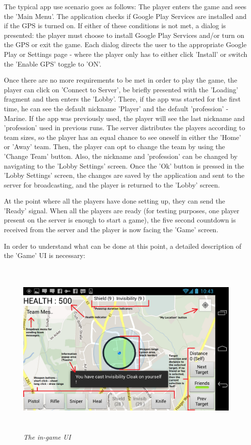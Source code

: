 The typical app use scenario goes as follows: The player enters the game and
sees the 'Main Menu'. The application checks if Google Play Services are
installed and if the GPS is turned on. If either of these conditions is not met,
a dialog is presented: the player must choose to install Google Play Services and/or turn on
the GPS or exit the game. Each dialog directs the user to the appropriate Google
Play or Settings page - where the player only has to either click 'Install' or
switch the 'Enable GPS' toggle to 'ON'.\newline

Once there are no more requirements to be met in order to play the game, the
player can click on 'Connect to Server', be briefly presented with the 'Loading'
fragment and then enters the 'Lobby'. There, if the app was started for the
first time, he can see the default nickname 'Player' and the default
'profession' - Marine. If the app was previously used, the player will see the
last nickname and 'profession' used in previous runs. The server distributes the
players according to team sizes, so the player has an equal chance to see
oneself in either the 'Home' or 'Away' team. Then, the player can opt to change
the team by using the 'Change Team' button. Also, the nickname and 'profession'
can be changed by navigating to the 'Lobby Settings' screen. Once the 'Ok'
button is pressed in the 'Lobby Settings' screen, the changes are saved by the
application and sent to the server for broadcasting, and the player is returned
to the 'Lobby' screen.\newline

At the point where all the players have done setting up, they can send the
'Ready' signal. When all the players are ready (for testing purposes, one
player present on the server is enough to start a game), the five second
countdown is received from the server and the player is now facing the 'Game'
screen.\newline

In order to understand what can be done at this point, a detailed description of
the 'Game' UI is necessary: \newline
 
\begin{figure}
\includegraphics[height=3.5in,width=6.23in]{./images/android_screenshots/tutorial_game.png}  
\caption{\small \sl The in-game UI \label{fig:game_ui}}
\end{figure}

